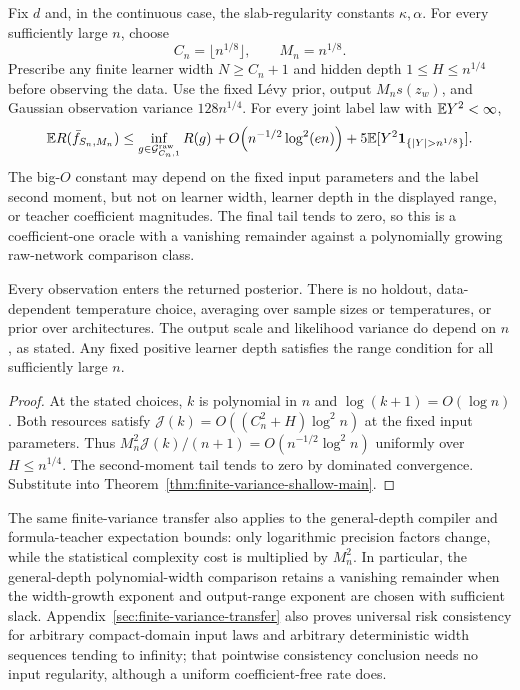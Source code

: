 \begin{corollary}
\label{cor:finite-variance-growing-width}
Fix $d$ and, in the continuous case, the slab-regularity constants $\kappa,\alpha$. For every sufficiently large $n$, choose
\[
 C_n=\lfloor n^{1/8}\rfloor,\qquad M_n=n^{1/8}.
\]
Prescribe any finite learner width $N\ge C_n+1$ and hidden depth
$1\le H\le n^{1/4}$ before observing the data. Use the fixed L\'evy prior, output $M_n s(z_w)$, and Gaussian observation variance $128n^{1/4}$. For every joint label law with $\mathbb E Y^2<\infty$,
\begin{equation}
 \E R(\bar f_{S_n,M_n})
 \le\inf_{g\in\mathcal G^{\mathrm{raw}}_{C_n,1}}R(g)
 +O\!\left(n^{-1/2}\log^2(en)\right)
 +5\E[Y^2\mathbf1_{\{|Y|>n^{1/8}\}}].
 \label{eq:finite-variance-growing-main}
\end{equation}
The big-$O$ constant may depend on the fixed input parameters and the label second moment, but not on learner width, learner depth in the displayed range, or teacher coefficient magnitudes. The final tail tends to zero, so this is a coefficient-one oracle with a vanishing remainder against a polynomially growing raw-network comparison class.

Every observation enters the returned posterior. There is no holdout, data-dependent temperature choice, averaging over sample sizes or temperatures, or prior over architectures. The output scale and likelihood variance do depend on $n$, as stated. Any fixed positive learner depth satisfies the range condition for all sufficiently large $n$.
\end{corollary}
\begin{proof}
At the stated choices, $k$ is polynomial in $n$ and $\log(k+1)=O(\log n)$. Both resources satisfy
$\mathcal J(k)=O((C_n^2+H)\log^2 n)$ at the fixed input parameters. Thus
$M_n^2\mathcal J(k)/(n+1)=O(n^{-1/2}\log^2n)$ uniformly over $H\le n^{1/4}$. The second-moment tail tends to zero by dominated convergence. Substitute into Theorem~\ref{thm:finite-variance-shallow-main}.
\end{proof}

The same finite-variance transfer also applies to the general-depth compiler and formula-teacher expectation bounds: only logarithmic precision factors change, while the statistical complexity cost is multiplied by $M_n^2$. In particular, the general-depth polynomial-width comparison retains a vanishing remainder when the width-growth exponent and output-range exponent are chosen with sufficient slack. Appendix~\ref{sec:finite-variance-transfer} also proves universal risk consistency for arbitrary compact-domain input laws and arbitrary deterministic width sequences tending to infinity; that pointwise consistency conclusion needs no input regularity, although a uniform coefficient-free rate does.
